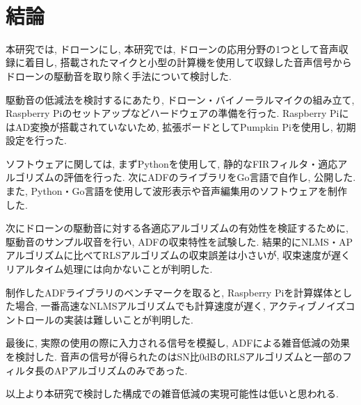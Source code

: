 \
\chapter{結論}\label{conclusion}

本研究では, ドローンにし, 
本研究では, ドローンの応用分野の1つとして音声収録に着目し, 搭載されたマイクと小型の計算機を使用して収録した音声信号からドローンの駆動音を取り除く手法について検討した. 

駆動音の低減法を検討するにあたり, ドローン・バイノーラルマイクの組み立て, Raspberry
Piのセットアップなどハードウェアの準備を行った.  Raspberry
PiにはAD変換が搭載されていないため, 拡張ボードとしてPumpkin
Piを使用し, 初期設定を行った. 

ソフトウェアに関しては, まずPythonを使用して, 静的なFIRフィルタ・適応アルゴリズムの評価を行った. 次にADFのライブラリをGo言語で自作し, 公開した. また, Python・Go言語を使用して波形表示や音声編集用のソフトウェアを制作した. 

次にドローンの駆動音に対する各適応アルゴリズムの有効性を検証するために, 駆動音のサンプル収音を行い, ADFの収束特性を試験した. 結果的にNLMS・APアルゴリズムに比べてRLSアルゴリズムの収束誤差は小さいが, 収束速度が遅くリアルタイム処理には向かないことが判明した. 

制作したADFライブラリのベンチマークを取ると, Raspberry
Piを計算媒体とした場合, 一番高速なNLMSアルゴリズムでも計算速度が遅く, アクティブノイズコントロールの実装は難しいことが判明した. 

最後に, 実際の使用の際に入力される信号を模擬し, ADFによる雑音低減の効果を検討した. 音声の信号が得られたのはSN比0dBのRLSアルゴリズムと一部のフィルタ長のAPアルゴリズムのみであった. 

以上より本研究で検討した構成での雑音低減の実現可能性は低いと思われる. 

